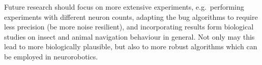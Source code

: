 \documentclass[letterpaper,10pt,conference]{ieeeconf}
\begin{document}
Future research should focus on more extensive experiments, e.g.~performing experiments with different neuron counts, adapting the bug algorithms to require less precision (be more noise resilient), and incorporating results form biological studies on insect and animal navigation behaviour in general. Not only may this lead to more biologically plausible, but also to more robust algorithms which can be employed in neurorobotics.



\printbibliography
\end{document}

